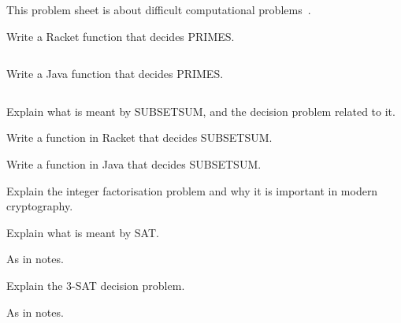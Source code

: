 \documentclass[addpoints,12pt]{exam}
\begin{document}

\noindent
This problem sheet is about difficult computational problems~\cite{sipserbook}.


\begin{questions}


\question
  Write a Racket function that decides PRIMES.
  \begin{solution}
    \begin{verbatim}

    \end{verbatim}
  \end{solution}

\question
  Write a Java function that decides PRIMES.
  \begin{solution}
    \begin{verbatim}

    \end{verbatim}
  \end{solution}


\question
  Explain what is meant by SUBSETSUM, and the decision problem related to it.

\question
  Write a function in Racket that decides SUBSETSUM.

\question
  Write a function in Java that decides SUBSETSUM.

\question
  Explain the integer factorisation problem and why it is important in modern cryptography.

\question
  Explain what is meant by SAT.

  \begin{solution}
  As in notes.
  \end{solution}

\question
  Explain the 3-SAT decision problem.
  \begin{solution}
  As in notes.
  \end{solution}



\end{questions}





\end{document}
